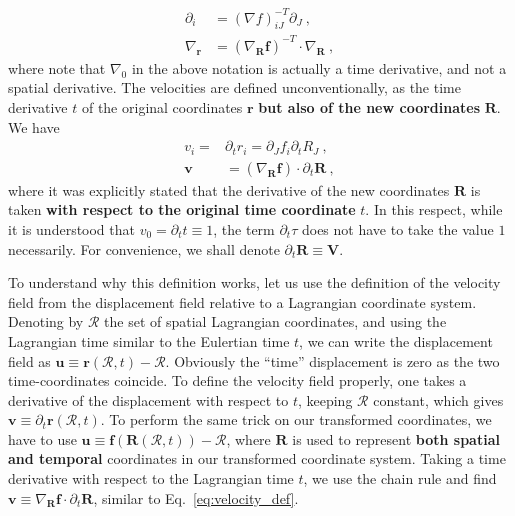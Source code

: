 \documentclass[12pt,a4paper]{article}
\begin{document}
\begin{equation}\label{eq:derivatives_generic}
\begin{split}
   \partial_i  & = \left(\nabla f\right)^{-T}_{iJ} \partial_J \ , \\
   \nabla_{\bm{r}}  & = \left(\nabla_{\bm{R}} \bm{f}\right)^{-T}\cdot \nabla_{\bm{R}} \ ,
\end{split}
\end{equation}
where note that $\nabla_0$ in the above notation is actually a time derivative, and not a spatial derivative.
The velocities are defined unconventionally, as the time derivative $t$ of the original coordinates $\bm{r}$ \textbf{but also of the new coordinates} $\bm{R}$. We have
\begin{equation}\label{eq:velocity_def}
\begin{split}
   v_i =  & \partial_t r_i = \partial_J f_i \partial_t R_J  \ ,\\
   \bm{v} & = \left(\nabla_{\bm{R}} \bm{f}\right) \cdot \partial_t\bm{R} \ ,
\end{split}
\end{equation}
where it was explicitly stated that the derivative of the new coordinates $\bm{R}$ is taken \textbf{with respect to the original time coordinate} $t$. In this respect, while it is understood that $v_0=\partial_t t\equiv 1$, the term $\partial_t \tau$ does not have to take the value $1$ necessarily. For convenience, we shall denote $\partial_t\bm{R}\equiv\bm{V}$.

To understand why this definition works, let us use the definition of the velocity field from the displacement field relative to a Lagrangian coordinate system. Denoting by $\mathcal{R}$ the set of spatial Lagrangian coordinates, and using the Lagrangian time similar to the Eulertian time $t$, we can write the displacement field as $\bm{u}\equiv \bm{r}\left(\mathcal{R},t\right)-\mathcal{R}$. Obviously the ``time'' displacement is zero as the two time-coordinates coincide. To define the velocity field properly, one takes a derivative of the displacement with respect to $t$, keeping $\mathcal{R}$ constant, which gives $\bm{v}\equiv\partial_t\bm{r}\left(\mathcal{R},t\right)$. To perform the same trick on our transformed coordinates, we have to use $\bm{u}\equiv \bm{f}\left(\bm{R}\left(\mathcal{R},t\right)\right)-\mathcal{R}$, where $\bm{R}$ is used to represent \textbf{both spatial and temporal} coordinates in our transformed coordinate system. Taking a time derivative with respect to the Lagrangian time $t$, we use the chain rule and find $\bm{v}\equiv\nabla_{\bm{R}}\bm{f}\cdot \partial_t \bm{R}$, similar to Eq.~\eqref{eq:velocity_def}.
\end{document}
